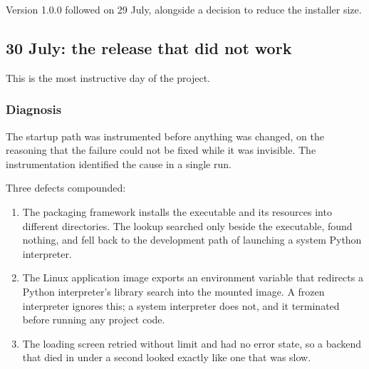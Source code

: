 \documentclass[11pt,a4paper]{article}
\begin{document}
Version 1.0.0 followed on 29 July, alongside a decision to reduce the installer
size.


\subsection{30 July: the release that did not work}


This is the most instructive day of the project.

\subsubsection{Diagnosis}

The startup path was instrumented before anything was changed, on the reasoning
that the failure could not be fixed while it was invisible. The instrumentation
identified the cause in a single run.

Three defects compounded:

\begin{enumerate}[leftmargin=*]
  \item The packaging framework installs the executable and its resources into
        different directories. The lookup searched only beside the executable,
        found nothing, and fell back to the development path of launching a
        system Python interpreter.
  \item The Linux application image exports an environment variable that
        redirects a Python interpreter's library search into the mounted image.
        A frozen interpreter ignores this; a system interpreter does not, and it
        terminated before running any project code.
  \item The loading screen retried without limit and had no error state, so a
        backend that died in under a second looked exactly like one that was
        slow.
\end{enumerate}
\end{document}
